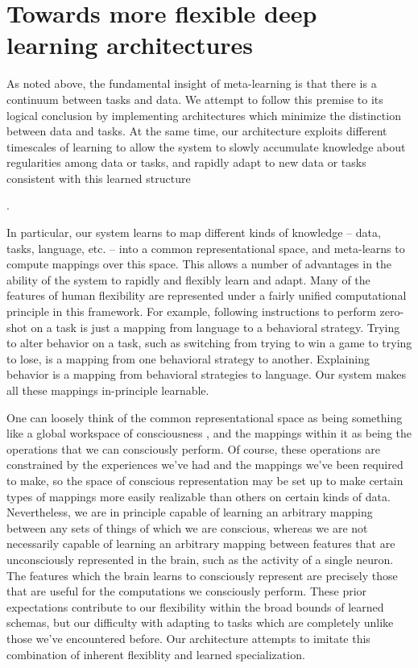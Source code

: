 \documentclass[11pt]{article}
\begin{document}
\section{Towards more flexible deep learning architectures}

As noted above, the fundamental insight of meta-learning is that there is a continuum between tasks and data. We attempt to follow this premise to its logical conclusion by implementing architectures which minimize the distinction between data and tasks. At the same time, our architecture exploits different timescales of learning to allow the system to slowly accumulate knowledge about regularities among data or tasks, and rapidly adapt to new data or tasks consistent with this learned structure \par.

In particular, our system learns to map different kinds of knowledge -- data, tasks, language, etc. -- into a common representational space, and meta-learns to compute mappings over this space. This allows a number of advantages in the ability of the system to rapidly and flexibly learn and adapt. Many of the features of human flexibility are represented under a fairly unified computational principle in this framework. For example, following instructions to perform zero-shot on a task is just a mapping from language to a behavioral strategy. Trying to alter behavior on a task, such as switching from trying to win a game to trying to lose, is a mapping from one behavioral strategy to another. Explaining behavior is a mapping from behavioral strategies to language. Our system makes all these mappings in-principle learnable. \par 

One can loosely think of the common representational space as being something like a global workspace of consciousness \citep{Baars2005, Dehaene2017}, and the mappings within it as being the operations that we can consciously perform. Of course, these operations are constrained by the experiences we've had and the mappings we've been required to make, so the space of conscious representation may be set up to make certain types of mappings more easily realizable than others on certain kinds of data. Nevertheless, we are in principle capable of learning an arbitrary mapping between any sets of things of which we are conscious, whereas we are not necessarily capable of learning an arbitrary mapping between features that are unconsciously represented in the brain, such as the activity of a single neuron. The features which the brain learns to consciously represent are precisely those that are useful for the computations we consciously perform. These prior expectations contribute to our flexibility within the broad bounds of learned schemas, but our difficulty with adapting to tasks which are completely unlike those we've encountered before. Our architecture attempts to imitate this combination of inherent flexiblity and learned specialization. \par  
\end{document}
